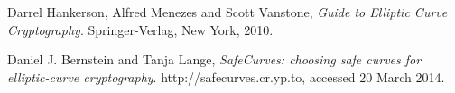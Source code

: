 \begin{thebibliography}{9}
	
		Darrel Hankerson, Alfred Menezes and Scott Vanstone,
		\emph{Guide to Elliptic Curve Cryptography}.
		Springer-Verlag, New York,
		2010.
		
		Daniel J. Bernstein and Tanja Lange,
		\emph{SafeCurves: choosing safe curves for elliptic-curve cryptography}.
		http://safecurves.cr.yp.to,
		accessed 20 March 2014.
	
\end{thebibliography}